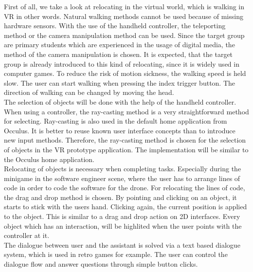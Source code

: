 First of all, we take a look at relocating in the virtual world, which is walking in VR in other words. Natural walking methods cannot be used because of missing hardware sensors. With the use of the handheld controller, the teleporting method or the camera manipulation method can be used. Since the target group are primary students which are experienced in the usage of digital media, the method of the camera manipulation is chosen. It is expected, that the target group is already introduced to this kind of relocating, since it is widely used in computer games. To reduce the risk of motion sickness, the walking speed is held slow. The user can start walking when pressing the index trigger button. The direction of walking can be changed by moving the head.\\
The selection of objects will be done with the help of the handheld controller. When using a controller, the ray-casting method is a very straightforward method for selecting. Ray-casting is also used in the default home application from Occulus. It is better to reuse known user interface concepts than to introduce new input methods. Therefore, the ray-casting method is chosen for the selection of objects in the VR prototype application. The implementation will be similar to the Occulus home application.\\
Relocating of objects is necessary when completing tasks. Especially during the minigame in the software engineer scene, where the user has to arrange lines of code in order to code the software for the drone. For relocating the lines of code, the drag and drop method is chosen. By pointing and clicking on an object, it starts to stick with the users hand. Clicking again, the current position is applied to the object. This is similar to a drag and drop action on 2D interfaces. Every object which has an interaction, will be highlited when the user points with the controller at it.\\
The dialogue between user and the assistant is solved via a text based dialogue system, which is used in retro games for example. The user can control the dialogue flow and answer questions through simple button clicks.
